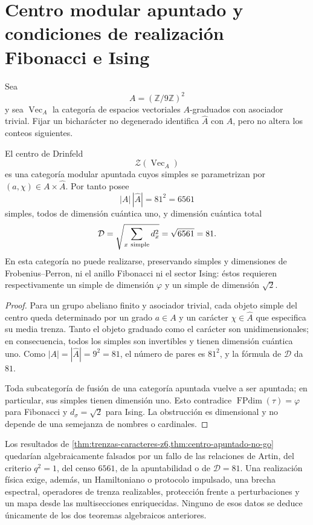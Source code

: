 \section[Centro modular y realizaciones topológicas]{Centro modular apuntado y condiciones de realización Fibonacci e Ising}
\label{sec:centro-apuntado-no-go}

Sea
\[
 A=(\mathbb Z/9\mathbb Z)^2
\]
y sea \(\operatorname{Vec}_A\) la categoría de espacios vectoriales
\(A\)-graduados con asociador trivial. Fijar un bicharácter no degenerado
identifica \(\widehat A\) con \(A\), pero no altera los conteos siguientes.

\begin{theorem}
\label{thm:centro-apuntado-no-go}
El centro de Drinfeld
\[
 \mathcal Z(\operatorname{Vec}_A)
\]
es una categoría modular apuntada cuyos simples se parametrizan por
\((a,\chi)\in A\times\widehat A\). Por tanto posee
\[
 |A|\,|\widehat A|=81^2=6561
\]
simples, todos de dimensión cuántica uno, y dimensión cuántica total
\[
 \mathcal D
 =\sqrt{\sum_{x\ {\rm simple}}d_x^2}
 =\sqrt{6561}=81.
\]
En esta categoría no puede realizarse, preservando simples y dimensiones de
Frobenius--Perron, ni el anillo Fibonacci ni el sector Ising: éstos requieren
respectivamente un simple de dimensión \(\varphi\) y un simple de dimensión
\(\sqrt2\).
\end{theorem}

\begin{proof}
Para un grupo abeliano finito y asociador trivial, cada objeto simple del
centro queda determinado por un grado \(a\in A\) y un carácter
\(\chi\in\widehat A\) que especifica su media trenza. Tanto el objeto
graduado como el carácter son unidimensionales; en consecuencia, todos los
simples son invertibles y tienen dimensión cuántica uno. Como
\(|A|=|\widehat A|=9^2=81\), el número de pares es \(81^2\), y la fórmula de
\(\mathcal D\) da \(81\).

Toda subcategoría de fusión de una categoría apuntada vuelve a ser apuntada;
en particular, sus simples tienen dimensión uno. Esto contradice
\(\operatorname{FPdim}(\tau)=\varphi\) para Fibonacci y
\(d_\sigma=\sqrt2\) para Ising. La obstrucción es dimensional y no depende
de una semejanza de nombres o cardinales.
\end{proof}

\begin{criterion}
\label{crit:promocion-sectores-topologicos}
Los resultados de
\cref{thm:trenzas-caracteres-z6,thm:centro-apuntado-no-go} quedarían
algebraicamente falsados por un fallo de las relaciones de Artin, del
criterio \(q^2=1\), del censo \(6561\), de la apuntabilidad o de
\(\mathcal D=81\). Una realización física exige, además, un
Hamiltoniano o protocolo impulsado, una brecha espectral, operadores de
trenza realizables, protección frente a perturbaciones y un mapa desde las
multisecciones enriquecidas. Ninguno de esos datos se deduce únicamente de
los dos teoremas algebraicos anteriores.
\end{criterion}
